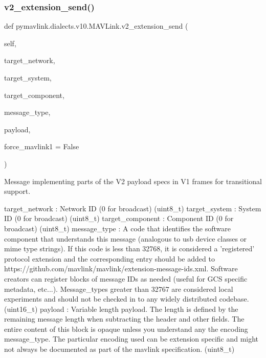 \begin{DoxyVerb}
\begin{DoxyVerb}
\begin{DoxyVerb}
\begin{DoxyVerb}
\begin{DoxyVerb}
\begin{DoxyVerb}
\begin{DoxyVerb}
\begin{DoxyVerb}
\begin{DoxyVerb}
\begin{DoxyVerb}
\subsubsection{\texorpdfstring{v2\+\_\+extension\+\_\+send()}{v2\_extension\_send()}}
{\footnotesize\ttfamily def pymavlink.\+dialects.\+v10.\+M\+A\+V\+Link.\+v2\+\_\+extension\+\_\+send (\begin{DoxyParamCaption}\item[{}]{self,  }\item[{}]{target\+\_\+network,  }\item[{}]{target\+\_\+system,  }\item[{}]{target\+\_\+component,  }\item[{}]{message\+\_\+type,  }\item[{}]{payload,  }\item[{}]{force\+\_\+mavlink1 = {\ttfamily False} }\end{DoxyParamCaption})}

\begin{DoxyVerb}Message implementing parts of the V2 payload specs in V1 frames for
transitional support.

target_network            : Network ID (0 for broadcast) (uint8_t)
target_system             : System ID (0 for broadcast) (uint8_t)
target_component          : Component ID (0 for broadcast) (uint8_t)
message_type              : A code that identifies the software component that understands this message (analogous to usb device classes or mime type strings).  If this code is less than 32768, it is considered a 'registered' protocol extension and the corresponding entry should be added to https://github.com/mavlink/mavlink/extension-message-ids.xml.  Software creators can register blocks of message IDs as needed (useful for GCS specific metadata, etc...). Message_types greater than 32767 are considered local experiments and should not be checked in to any widely distributed codebase. (uint16_t)
payload                   : Variable length payload. The length is defined by the remaining message length when subtracting the header and other fields.  The entire content of this block is opaque unless you understand any the encoding message_type.  The particular encoding used can be extension specific and might not always be documented as part of the mavlink specification. (uint8_t)\end{DoxyVerb}
 \mbox{\label{classpymavlink_1_1dialects_1_1v10_1_1MAVLink_a86023dcc99c0ea72daf5f2025f3bfaac}} 

\end{DoxyVerb}
\end{DoxyVerb}
\end{DoxyVerb}
\end{DoxyVerb}
\end{DoxyVerb}
\end{DoxyVerb}
\end{DoxyVerb}
\end{DoxyVerb}
\end{DoxyVerb}
\end{DoxyVerb}
